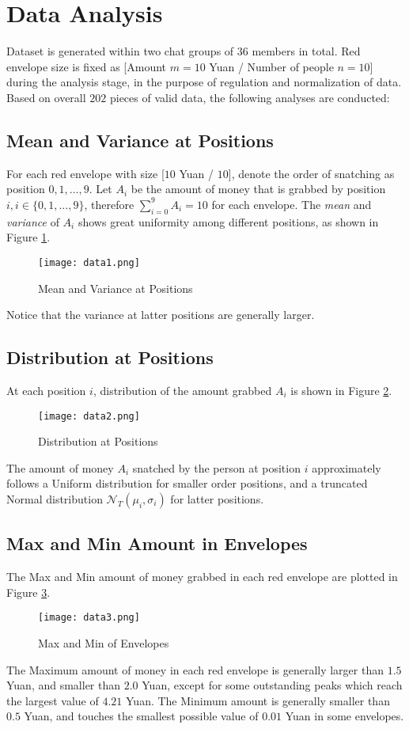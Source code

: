 \documentclass[10pt,journal]{IEEEtran}
\begin{document}
\section{Data Analysis}
Dataset is generated within two chat groups of $36$ members in total. Red envelope size is fixed as [Amount $m = 10$ Yuan / Number of people $n = 10$] during the analysis stage, in the purpose of regulation and normalization of data. Based on overall $202$ pieces of valid data, the following analyses are conducted:
\subsection{Mean and Variance at Positions}
For each red envelope with size [$10$ Yuan / $10$], denote the order of snatching as position $0, 1, \dots , 9$. Let $A_i$ be the amount of money that is grabbed by position $i, i \in \{0, 1, \dots , 9\}$, therefore $\sum_{i=0}^9 A_i = 10$ for each envelope. The \textit{mean} and \textit{variance} of $A_i$ shows great uniformity among different positions, as shown in Figure \ref{fig:data1}.
\begin{figure}[H]
	\centering
	\texttt{[image: data1.png]}
	\caption{Mean and Variance at Positions} \label{fig:data1}
\end{figure}
Notice that the variance at latter positions are generally larger.
\subsection{Distribution at Positions}
At each position $i$, distribution of the amount grabbed $A_i$ is shown in Figure \ref{fig:data2}.
\begin{figure}[H]
	\centering
	\texttt{[image: data2.png]}
	\caption{Distribution at Positions} \label{fig:data2}
\end{figure}
The amount of money $A_i$ snatched by the person at position $i$ approximately follows a Uniform distribution for smaller order positions, and a truncated Normal distribution $\mathcal{N}_T(\mu_i, \sigma_i)$ for latter positions.
\subsection{Max and Min Amount in Envelopes}
The Max and Min amount of money grabbed in each red envelope are plotted in Figure \ref{fig:data3}.
\begin{figure}[H]
	\centering
	\texttt{[image: data3.png]}
	\caption{Max and Min of Envelopes} \label{fig:data3}
\end{figure}
The Maximum amount of money in each red envelope is generally larger than $1.5$ Yuan, and smaller than $2.0$ Yuan, except for some outstanding peaks which reach the largest value of $4.21$ Yuan. The Minimum amount is generally smaller than $0.5$ Yuan, and touches the smallest possible value of $0.01$ Yuan in some envelopes.
\end{document}
